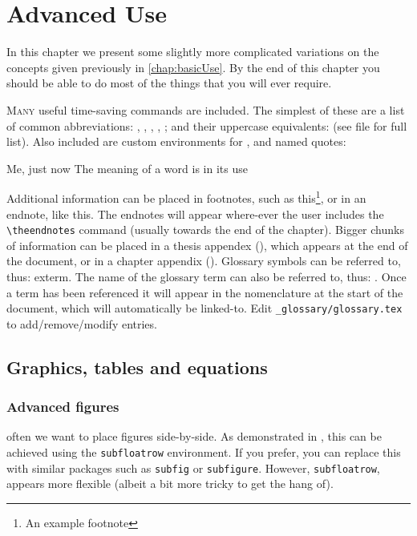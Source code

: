 \chapter{Advanced Use}
\label{chap:advancedUse}

\begin{chapabstract}
In this chapter we present some slightly more complicated variations on the concepts given previously in \cref{chap:basicUse}. By the end of this chapter you should be able to do most of the things that you will ever require.
\end{chapabstract}

\lettrine[lines=2,slope=5pt,findent=4pt,nindent=0pt]{M}{any} useful time-saving commands are included. The simplest of these are a list of common abbreviations: \eg \ie \etc, \naive, \cpright, \dprime, \about; and their uppercase equivalents: \Ie \Eg \etc (see  file for full list). Also included are custom environments for , and named quotes:

\begin{quotetext}{Me, just now}
The meaning of a word is in its use
\end{quotetext}

Additional information can be placed in footnotes, such as this\footnote{An example footnote}, or in an endnote, like this. The endnotes will appear where-ever the user includes the \verb|\theendnotes| command (usually towards the end of the chapter). Bigger chunks of information can be placed in a thesis appendex (\eg {}), which appears at the end of the document, or in a chapter appendix (\eg {}). Glossary symbols can be referred to, thus: \gls{exterm}. The name of the glossary term can also be referred to, thus: . Once a term has been referenced it will appear in the nomenclature at the start of the document, which will automatically be linked-to. Edit \verb|_glossary/glossary.tex| to add/remove/modify entries.

\section{Graphics, tables and equations}

\subsection{Advanced figures}
often we want to place figures side-by-side. As demonstrated in , this can be achieved using the \verb|subfloatrow| environment. If you prefer, you can replace this with similar packages such as \verb|subfig| or \verb|subfigure|. However, \verb|subfloatrow|, appears more flexible (albeit a bit more tricky to get the hang of).



